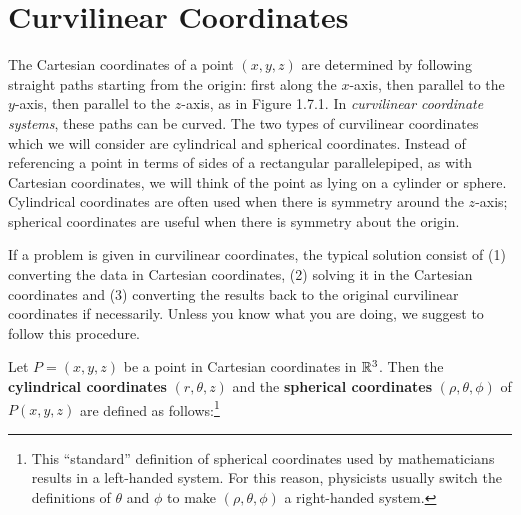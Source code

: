 \newpage
\section{Curvilinear Coordinates}
\piccaption[]{}
The Cartesian coordinates of a point $(x,y,z)$ are determined by following straight paths starting from the origin: 
first along the $x$-axis, then parallel to the $y$-axis, then parallel to the $z$-axis, as in
Figure 1.7.1. In \emph{curvilinear coordinate systems}, these paths can be curved.
The two types of curvilinear coordinates which we will consider are cylindrical and
spherical coordinates.
Instead of referencing a point in terms of sides of a rectangular parallelepiped, as with Cartesian coordinates, we will
think of the point as lying on a cylinder or sphere.
Cylindrical coordinates are often used when there is symmetry around the $z$-axis; 
spherical coordinates are useful when there is symmetry about the origin.

If a problem is given in curvilinear coordinates, 
the typical solution consist of (1) converting the data in Cartesian coordinates, (2) solving it in the Cartesian coordinates and (3) converting the results back to the original curvilinear coordinates if necessarily.
Unless you know what you are doing, we suggest to follow this procedure.

Let $P = (x,y,z)$ be
a point in Cartesian coordinates in $\mathbb{R}^{3}$.
Then the
\textbf{cylindrical coordinates} $(r,\theta,z)$  and the \textbf{spherical coordinates} $ (\rho,\theta,\phi)$ of
$P(x,y,z)$ are defined as follows:\footnote{This ``standard'' definition of
spherical coordinates used by mathematicians results in a
left-handed system. 
For this reason, physicists usually switch the definitions
of $\theta$ and $\phi$ to make $(\rho,\theta,\phi)$ a right-handed system.}\vspace{2mm}


